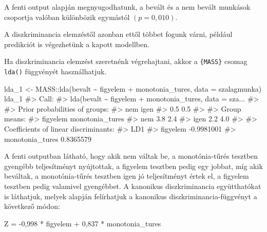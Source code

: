 \documentclass[
  letterpaper,
]{krantz}
\makeatletter
\newenvironment{Shaded}{\begin{snugshade}}{\end{snugshade}}
\newcommand{\AttributeTok}[1]{\textcolor[rgb]{0.40,0.45,0.13}{#1}}
\newcommand{\CommentTok}[1]{\textcolor[rgb]{0.37,0.37,0.37}{#1}}
\newcommand{\FunctionTok}[1]{\textcolor[rgb]{0.28,0.35,0.67}{#1}}
\newcommand{\NormalTok}[1]{\textcolor[rgb]{0.00,0.23,0.31}{#1}}
\newcommand{\OtherTok}[1]{\textcolor[rgb]{0.00,0.23,0.31}{#1}}
\newcommand{\SpecialCharTok}[1]{\textcolor[rgb]{0.37,0.37,0.37}{#1}}
\newenvironment{kframe}{%
\medskip{}
\setlength{\fboxsep}{.8em}
 \def\at@end@of@kframe{}%
 \ifinner\ifhmode%
  \def\at@end@of@kframe{\end{minipage}}%
  \begin{minipage}{\columnwidth}%
 \fi\fi%
 \def\FrameCommand##1{\hskip\@totalleftmargin \hskip-\fboxsep
 \colorbox{shadecolor}{##1}\hskip-\fboxsep
     \hskip-\linewidth \hskip-\@totalleftmargin \hskip\columnwidth}%
 \MakeFramed {\advance\hsize-\width
   \@totalleftmargin\z@ \linewidth\hsize
   \@setminipage}}%
 {\par\unskip\endMakeFramed%
 \at@end@of@kframe}
\renewenvironment{Shaded}{\begin{kframe}}{\end{kframe}}
\makeatother
\begin{document}
A fenti output alapján megnyugodhatunk, a bevált és a nem bevált
munkások csoportja valóban különbözik egymástól \((p=0,010)\).

A diszkriminancia elemzéstől azonban ettől többet fogunk várni, például
predikciót is végezhetünk a kapott modellben.

Ha diszkriminancia elemzést szeretnénk végrehajtani, akkor a
\texttt{\{MASS\}} csomag \texttt{lda()} függvényét használhatjuk.

\begin{Shaded}
\begin{Highlighting}[]
\NormalTok{lda\_1 }\OtherTok{\textless{}{-}}\NormalTok{ MASS}\SpecialCharTok{::}\FunctionTok{lda}\NormalTok{(bevalt }\SpecialCharTok{\textasciitilde{}}\NormalTok{ figyelem }\SpecialCharTok{+}\NormalTok{ monotonia\_tures, }\AttributeTok{data =}\NormalTok{ szalagmunka)}
\NormalTok{lda\_1}
\CommentTok{\#\textgreater{} Call:}
\CommentTok{\#\textgreater{} lda(bevalt \textasciitilde{} figyelem + monotonia\_tures, data = sza...}
\CommentTok{\#\textgreater{} }
\CommentTok{\#\textgreater{} Prior probabilities of groups:}
\CommentTok{\#\textgreater{}  nem igen }
\CommentTok{\#\textgreater{}  0.5  0.5 }
\CommentTok{\#\textgreater{} }
\CommentTok{\#\textgreater{} Group means:}
\CommentTok{\#\textgreater{}      figyelem monotonia\_tures}
\CommentTok{\#\textgreater{} nem       3.8             2.4}
\CommentTok{\#\textgreater{} igen      2.2             4.0}
\CommentTok{\#\textgreater{} }
\CommentTok{\#\textgreater{} Coefficients of linear discriminants:}
\CommentTok{\#\textgreater{}                        LD1}
\CommentTok{\#\textgreater{} figyelem        {-}0.9981001}
\CommentTok{\#\textgreater{} monotonia\_tures  0.8365579}
\end{Highlighting}
\end{Shaded}

A fenti outputban látható, hogy akik nem váltak be, a monotónia-tűrés
tesztben gyengébb teljesítményt nyújtottak, a figyelem tesztben pedig
egy jobbat, míg akik beváltak, a monotónia-tűrés tesztben igen jó
teljesítményt értek el, a figyelem tesztben pedig valamivel gyengébbet.
A kanonikus diszkriminancia együtthatókat is láthatjuk, melyek alapján
felírhatjuk a kanonikus diszkriminancia-függvényt a következő módon:

\begin{Shaded}
\begin{Highlighting}[]
\NormalTok{Z = {-}0,998 * figyelem + 0,837 * monotonia\_tures}
\end{Highlighting}
\end{Shaded}
\end{document}
